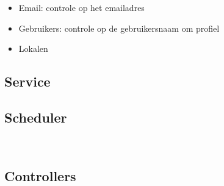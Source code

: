 \begin{itemize}
	\item Email: controle op het emailadres
	\item Gebruikers: controle op de gebruikersnaam om profiel
	\item Lokalen
\end{itemize}

\subsection{Service}
\label{subsec:controllers}
\subsection{Scheduler}
\label{subsec:controllers}\\
\subsection{Controllers}
\label{subsec:controllers}